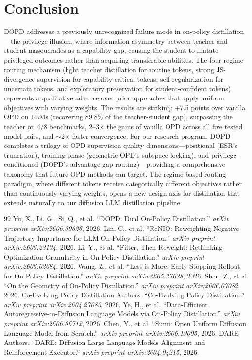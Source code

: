 \documentclass[11pt,a4paper]{article}
\begin{document}
\section{Conclusion}

DOPD addresses a previously unrecognized failure mode in on-policy distillation---the privilege illusion, where information asymmetry between teacher and student masquerades as a capability gap, causing the student to imitate privileged outcomes rather than acquiring transferable abilities. The four-regime routing mechanism (light teacher distillation for routine tokens, strong JS-divergence supervision for capability-critical tokens, self-regularization for uncertain tokens, and exploratory preservation for student-confident tokens) represents a qualitative advance over prior approaches that apply uniform objectives with varying weights. The results are striking: +7.5 points over vanilla OPD on LLMs (recovering 89.8\% of the teacher-student gap), surpassing the teacher on 4/8 benchmarks, 2--3$\times$ the gains of vanilla OPD across all five tested model pairs, and $\sim$2$\times$ faster convergence. For our research program, DOPD completes a trilogy of OPD supervision quality dimensions---positional (ESR's truncation), training-phase (geometric OPD's subspace locking), and privilege-conditioned (DOPD's advantage gap routing)---providing a comprehensive taxonomy that future OPD methods can target. The regime-based routing paradigm, where different tokens receive categorically different objectives rather than continuously varying weights, opens a new design axis for distillation that extends naturally to our diffusion LLM distillation pipeline.

\begin{thebibliography}{99}
 Yu, X., Li, G., Si, Q., et al. ``DOPD: Dual On-Policy Distillation.'' \emph{arXiv preprint arXiv:2606.30626}, 2026.
 Lin, C., et al. ``ReNIO: Reweighting Negative Trajectory Importance for LLM On-Policy Distillation.'' \emph{arXiv preprint arXiv:2606.23104}, 2026.
 Li, Y., et al. ``Filter, Then Reweight: Rethinking Optimization Granularity in On-Policy Distillation.'' \emph{arXiv preprint arXiv:2606.02684}, 2026.
 Wang, Z., et al. ``Less is More: Early Stopping Rollout for On-Policy Distillation.'' \emph{arXiv preprint arXiv:2605.27028}, 2026.
 Shen, Z., et al. ``On the Geometry of On-Policy Distillation.'' \emph{arXiv preprint arXiv:2606.07082}, 2026.
 Co-Evolving Policy Distillation Authors. ``Co-Evolving Policy Distillation.'' \emph{arXiv preprint arXiv:2604.27083}, 2026.
 Ye, H., et al. ``Data-Efficient Autoregressive-to-Diffusion Language Models via On-Policy Distillation.'' \emph{arXiv preprint arXiv:2606.06712}, 2026.
 Chen, Y., et al. ``Sumi: Open Uniform Diffusion Language Model from Scratch.'' \emph{arXiv preprint arXiv:2606.19005}, 2026.
 DARE Authors. ``DARE: Diffusion Large Language Models Alignment and Reinforcement Executor.'' \emph{arXiv preprint arXiv:2604.04215}, 2026.
\end{thebibliography}
\end{document}
